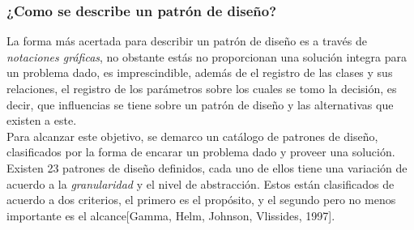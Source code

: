 \subsubsection {¿Como se describe un patrón de diseño?}
\noindent La forma más acertada para describir un patrón de diseño es a través de \textit {notaciones gráficas},
\noindent no obstante estás no proporcionan una solución integra para un problema dado, es imprescindible, además de
\noindent el registro de las clases y sus relaciones, el registro de los parámetros sobre los cuales se tomo la decisión,
\noindent es decir, que influencias se tiene sobre un patrón de diseño y las alternativas que existen a este.\\
\noindent Para alcanzar este objetivo, se demarco un catálogo de patrones de diseño, clasificados por la forma de encarar
\noindent un problema dado y proveer una solución.\\
\noindent Existen 23 patrones de diseño definidos, cada uno de ellos tiene una variación de acuerdo a la \textit{granularidad}
\noindent y el nivel de abstracción.
\noindent Estos están clasificados de acuerdo a dos criterios, el primero es el propósito, y el segundo
\noindent pero no menos importante es el alcance[Gamma, Helm, Johnson, Vlissides, 1997].\\
